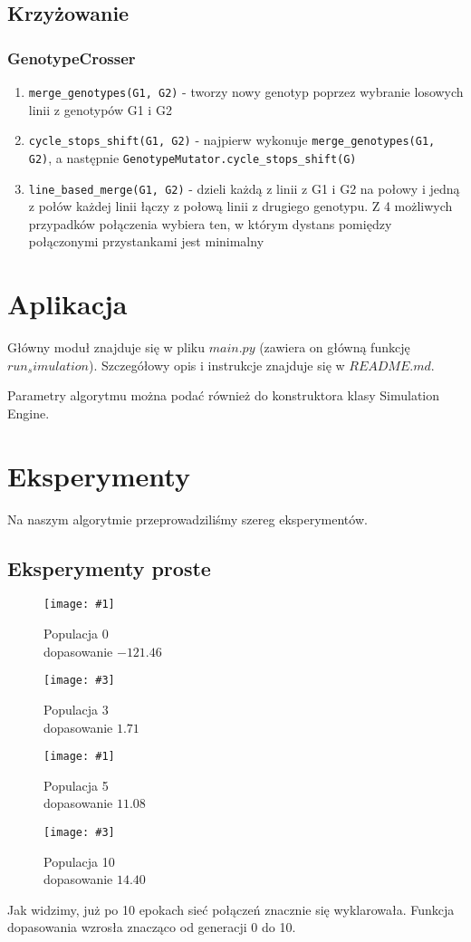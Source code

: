 \documentclass[12pt,a4paper]{article}
\newcommand{\imgsidebyside}[4]{
	\begin{figure}[H]
		\centering
		\begin{minipage}{.45\textwidth}
			\centering
			\texttt{[image: \#1]}
			\caption{#2}
		\end{minipage}%
		\hfill
		\begin{minipage}{.45\textwidth}
			\centering
			\texttt{[image: \#3]}
			\caption{#4}
		\end{minipage}
	\end{figure}
}
\begin{document}
\subsection{Krzyżowanie}

\subsubsection{GenotypeCrosser}

\begin{enumerate}
    \item \lstinline{merge_genotypes(G1, G2)} - tworzy nowy genotyp poprzez wybranie losowych linii z genotypów G1 i G2
    \item \lstinline{cycle_stops_shift(G1, G2)} - najpierw wykonuje \lstinline{merge_genotypes(G1, G2)}, a następnie \lstinline{GenotypeMutator.cycle_stops_shift(G)}
    \item \lstinline{line_based_merge(G1, G2)} - dzieli każdą z linii z G1 i G2 na połowy i jedną z połów każdej linii łączy z połową linii z drugiego genotypu. Z 4 możliwych przypadków połączenia wybiera ten, w którym dystans pomiędzy połączonymi przystankami jest minimalny
\end{enumerate}

\section{Aplikacja}

Główny moduł znajduje się w pliku $main.py$ (zawiera on główną funkcję $run_simulation$). Szczegółowy opis i instrukcje znajduje się w $README.md$.

Parametry algorytmu można podać również do konstruktora klasy Simulation Engine.

\section{Eksperymenty}
Na naszym algorytmie przeprowadziliśmy szereg eksperymentów.

\subsection{Eksperymenty proste}
\imgsidebyside{test1/0}{Populacja 0\\ dopasowanie $-121.46$}{test1/3}{Populacja 3\\ dopasowanie $1.71$}
\imgsidebyside{test1/5}{Populacja 5\\ dopasowanie $11.08$}{test1/10}{Populacja 10\\ dopasowanie $14.40$}
Jak widzimy, już po 10 epokach sieć połączeń znacznie się wyklarowała. Funkcja dopasowania wzrosła znacząco od generacji 0 do 10.
\end{document}
